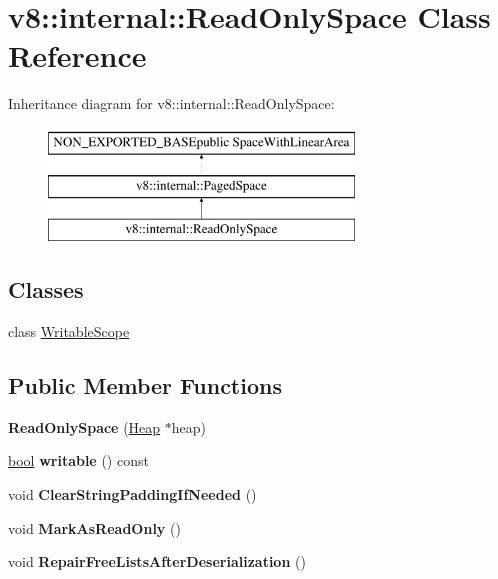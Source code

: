\hypertarget{classv8_1_1internal_1_1ReadOnlySpace}{}\section{v8\+:\+:internal\+:\+:Read\+Only\+Space Class Reference}
\label{classv8_1_1internal_1_1ReadOnlySpace}
Inheritance diagram for v8\+:\+:internal\+:\+:Read\+Only\+Space\+:\begin{figure}[H]
\begin{center}
\leavevmode
\includegraphics[height=3.000000cm]{classv8_1_1internal_1_1ReadOnlySpace}
\end{center}
\end{figure}
\subsection*{Classes}
\begin{DoxyCompactItemize}
\item 
class \mbox{\hyperlink{classv8_1_1internal_1_1ReadOnlySpace_1_1WritableScope}{Writable\+Scope}}
\end{DoxyCompactItemize}
\subsection*{Public Member Functions}
\begin{DoxyCompactItemize}
\item 
\mbox{\label{classv8_1_1internal_1_1ReadOnlySpace_a9303c1de239dfbc5c9df51b13f76423b}} 
{\bfseries Read\+Only\+Space} (\mbox{\hyperlink{classv8_1_1internal_1_1Heap}{Heap}} $\ast$heap)
\item 
\mbox{\label{classv8_1_1internal_1_1ReadOnlySpace_a35e4a97560dd39bfb69dbc392ce7952a}} 
\mbox{\hyperlink{classbool}{bool}} {\bfseries writable} () const
\item 
\mbox{\label{classv8_1_1internal_1_1ReadOnlySpace_a450e737890a3f24c18090fffdce8f943}} 
void {\bfseries Clear\+String\+Padding\+If\+Needed} ()
\item 
\mbox{\label{classv8_1_1internal_1_1ReadOnlySpace_a216196e84e79c2f35a9e2039c31270f6}} 
void {\bfseries Mark\+As\+Read\+Only} ()
\item 
\mbox{\label{classv8_1_1internal_1_1ReadOnlySpace_ab0488d237b1efbf2ff108c2a9d2a7fac}} 
void {\bfseries Repair\+Free\+Lists\+After\+Deserialization} ()
\end{DoxyCompactItemize}
